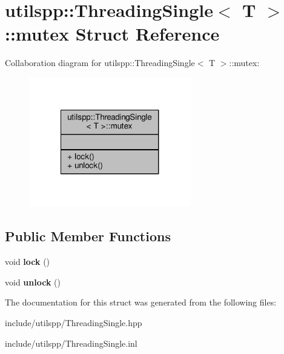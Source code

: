 \hypertarget{structutilspp_1_1ThreadingSingle_1_1mutex}{\section{utilspp\-:\-:Threading\-Single$<$ T $>$\-:\-:mutex Struct Reference}
\label{structutilspp_1_1ThreadingSingle_1_1mutex}
}


Collaboration diagram for utilspp\-:\-:Threading\-Single$<$ T $>$\-:\-:mutex\-:
\nopagebreak
\begin{figure}[H]
\begin{center}
\leavevmode
\includegraphics[width=200pt]{structutilspp_1_1ThreadingSingle_1_1mutex__coll__graph}
\end{center}
\end{figure}
\subsection*{Public Member Functions}
\begin{DoxyCompactItemize}
\item 
\hypertarget{structutilspp_1_1ThreadingSingle_1_1mutex_a2eccbfd8e90e03d967649c3223510dbe}{void {\bfseries lock} ()}\label{structutilspp_1_1ThreadingSingle_1_1mutex_a2eccbfd8e90e03d967649c3223510dbe}

\item 
\hypertarget{structutilspp_1_1ThreadingSingle_1_1mutex_a4db91d8763bae7bb3a3dacb0ec56ea1f}{void {\bfseries unlock} ()}\label{structutilspp_1_1ThreadingSingle_1_1mutex_a4db91d8763bae7bb3a3dacb0ec56ea1f}

\end{DoxyCompactItemize}


The documentation for this struct was generated from the following files\-:\begin{DoxyCompactItemize}
\item 
include/utilspp/Threading\-Single.\-hpp\item 
include/utilspp/Threading\-Single.\-inl\end{DoxyCompactItemize}
